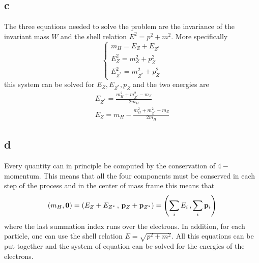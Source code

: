 \subsection*{c}
The three equations needed to solve the problem are the invariance of the invariant mass $W$ and the shell relation $E^2 = p^2 + m^2$. 
More specifically
\begin{equation*}\begin{cases}
    m_H = E_Z + E_{Z^*} \\
    E_Z^2 = m_Z^2 + p_Z^2 \\
    E_{Z^*}^2 = m_{Z^*}^2 + p_Z^2
\end{cases}\end{equation*}
this system can be solved for $E_Z, E_{Z^*}, p_Z$ and the two energies are
\begin{gather*}
    E_{Z^*} = \frac{m_H^2 + m_{Z^*}^2 - m_Z}{2m_H} \\
    E_Z = m_H - \frac{m_H^2 + m_{Z^*}^2 - m_Z}{2m_H}
\end{gather*}

\subsection*{d}
Every quantity can in principle be computed by the conservation of $4-$momentum. This means that 
all the four components must be conserved in each step of the process and in the center of mass frame this means that
\begin{equation*}
    (m_H, \mathbf{0}) = (E_Z + E_{Z^*} \, , \, \mathbf{p}_Z + \mathbf{p}_{Z^*}) = \left(\sum_i E_i \, , \sum_i \mathbf{p}_i \right)
\end{equation*}
where the last summation index runs over the electrons. In addition, for each particle, one can use the shell relation $E = \sqrt{p^2 + m^2}$.
All this equations can be put together and the system of equation can be solved for the energies of the electrons.